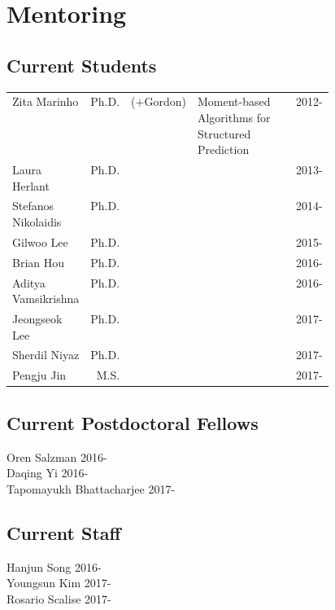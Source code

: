 

\section{Mentoring} 
\subsection{Current Students}
\vspace{-1em}
\begin{center}
\begin{tabular}{lrlp{0.455\linewidth}l}
Zita Marinho & Ph.D. &(+Gordon) & Moment-based Algorithms for Structured Prediction & 2012-\\
Laura Herlant & Ph.D. & & & 2013-\\
Stefanos Nikolaidis & Ph.D. & & & 2014-\\
Gilwoo Lee & Ph.D. &  & & 2015-\\
Brian Hou & Ph.D. & & & 2016-\\
Aditya Vamsikrishna & Ph.D. & & & 2016-\\
Jeongseok Lee & Ph.D. & & & 2017-\\
Sherdil Niyaz & Ph.D. & & & 2017-\\
Pengju Jin & M.S. & & & 2017-\\
\end{tabular}
\end{center}

\subsection{Current Postdoctoral Fellows}
\noindent
Oren Salzman \hfill 2016-\\
Daqing Yi \hfill 2016-\\
Tapomayukh Bhattacharjee \hfill 2017-\\

\subsection{Current Staff}
\noindent
Hanjun Song \hfill 2016-\\
Youngsun Kim \hfill 2017-\\
Rosario Scalise \hfill 2017-\\


